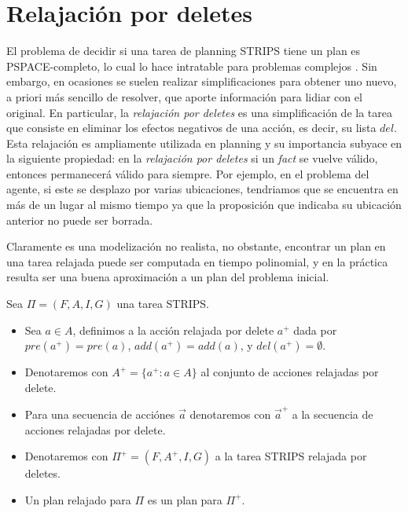 \section{Relajación por deletes}

El problema de decidir si una tarea de planning STRIPS tiene un plan es
PSPACE-completo, lo cual lo hace intratable para problemas complejos
\citep{Nau-Ghallab-Malik-Traverso-2004}. Sin embargo, en ocasiones se suelen
realizar simplificaciones para obtener uno nuevo, a priori más sencillo de
resolver, que aporte información para lidiar con el original. En particular, la
\emph{relajación por deletes} es una simplificación de la tarea que consiste en
eliminar los efectos negativos de una acción, es decir, su lista $del$. Esta
relajación es ampliamente utilizada en planning y su importancia subyace en la
siguiente propiedad: en la \emph{relajación por deletes} si un \emph{fact} se
vuelve válido, entonces permanecerá válido para siempre. Por ejemplo, en el
problema del agente, si este se desplazo por varias ubicaciones, tendriamos que
se encuentra en más de un lugar al mismo tiempo ya que la proposición que
indicaba su ubicación anterior no puede ser borrada.

Claramente es una modelización no realista, no obstante, encontrar un plan en una
tarea relajada puede ser computada en tiempo polinomial, y en la práctica
resulta ser una buena aproximación a un plan del problema inicial.

\begin{mydef}
    Sea $\Pi = (F, A, I, G)$ una tarea STRIPS.
    \begin{itemize}
        \item Sea $a \in A$, definimos a la acción relajada por delete $a^{+}$
        dada por $pre(a^{+}) = pre(a)$, $add(a^{+}) = add(a)$, y $del(a^{+}) =
        \emptyset$.

        \item Denotaremos con $A^{+} = \{a^{+} : a \in A\}$ al conjunto de
        acciones relajadas por delete.

        \item Para una secuencia de acciónes $\vec{a}$ denotaremos con
        $\vec{a}^{+}$ a la secuencia de acciones relajadas por delete.

        \item Denotaremos con $\Pi^{+} = (F, A^{+}, I, G)$ a la tarea STRIPS
        relajada por deletes.

        \item Un plan relajado para $\Pi$ es un plan para $\Pi^{+}$.
    \end{itemize}
\end{mydef}

